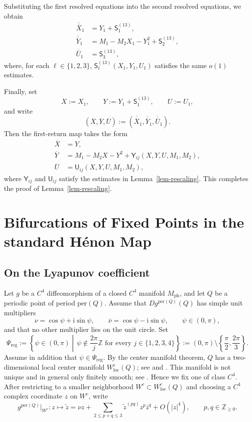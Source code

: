 \documentclass[11pt,a4paper]{article}
\theoremstyle{plain}
\theoremstyle{definition}
\theoremstyle{plain}
\numberwithin{equation}{section}
\begin{document}
Substituting the first resolved equations into the second resolved equations, we obtain
\begin{align*}
\overline{\overline{X}}_1 &= Y_1 + \mathsf{S}_1^{(13)}, \\
\overline{\overline{Y}}_1 &= M_1 - M_2 X_1 - Y_1^2 + \mathsf{S}_2^{(13)}, \\
\overline{\overline{U}}_1 &= \mathsf{S}_3^{(13)},
\end{align*}
where, for each $\ell \in \{1,2,3\}$, $\mathsf{S}_\ell^{(13)}(X_1, Y_1, U_1)$ satisfies the same $o(1)$ estimates.

Finally, set
\[
X := X_1,
\qquad
Y := Y_1 + \mathsf{S}_1^{(13)},
\qquad
U := U_1,
\]
and write
\[
(\overline{X},\overline{Y},\overline{U})
:=
(\overline{\overline{X}}_1,\overline{\overline{Y}}_1,\overline{\overline{U}}_1).
\]
Then the first-return map takes the form
\begin{align*}
\overline{X} &= Y, \\
\overline{Y} &= M_1 - M_2 X - Y^2 + \mathsf{Y}_{ij}(X,Y,U,M_1,M_2), \\
\overline{U} &= \mathsf{U}_{ij}(X,Y,U,M_1,M_2),
\end{align*}
where $\mathsf{Y}_{ij}$ and $\mathsf{U}_{ij}$ satisfy the estimates in Lemma~\ref{lem-rescaling}. This completes the proof of Lemma~\ref{lem-rescaling}.



\section{Bifurcations of Fixed Points in the standard H\'enon Map}
\label{sec-BFPHM}

\subsection{On the Lyapunov coefficient}
\label{sec-LC}

Let $g$ be a $C^4$ diffeomorphism of a closed $C^4$ manifold $M_\mathrm{ph}$, and let $Q$ be a periodic point of period $\mathrm{per}(Q)$. Assume that $Dg^{\mathrm{per}(Q)}(Q)$ has simple unit multipliers
\[
\nu = \cos\psi + \mathrm{i}\sin\psi,
\qquad
\overline\nu = \cos\psi - \mathrm{i}\sin\psi,
\qquad
\psi \in (0,\pi),
\]
and that no other multiplier lies on the unit circle.
Set
\[
\Psi_\mathrm{reg}
:=
\left\{
\psi \in (0,\pi)
\middle|\,
\psi \notin \frac{2\pi}{j}\mathbb{Z}
\text{ for every }
j \in \{1,2,3,4\}
\right\}
:=
(0,\pi) \setminus \left\{\frac{\pi}{2}, \frac{2\pi}{3}\right\}.
\]
Assume in addition that $\psi \in \Psi_\mathrm{reg}$. By the center manifold theorem, $Q$ has a two-dimensional local center manifold $W^c_\mathrm{loc}(Q)$; see \cite{Kelley1967} and \cite[Section~5A]{HPS1977}. This manifold is not unique and in general only finitely smooth; see \cite[Section~5.10.2]{Robinson1999}. Hence we fix one of class $C^4$. After restricting to a smaller neighborhood $W^c \subset W^c_\mathrm{loc}(Q)$ and choosing a $C^4$ complex coordinate $z$ on $W^c$, write
\[
g^{\mathrm{per}(Q)}|_{W^c} : z \longmapsto \widetilde{z}
=
\nu z
+
\sum_{2 \le p+q \le 3} \widetilde{z}^{(pq)} z^p \overline z^q
+
O(|z|^4),
\qquad
p, q \in \mathbb{Z}_{\ge 0}.
\]
\end{document}
